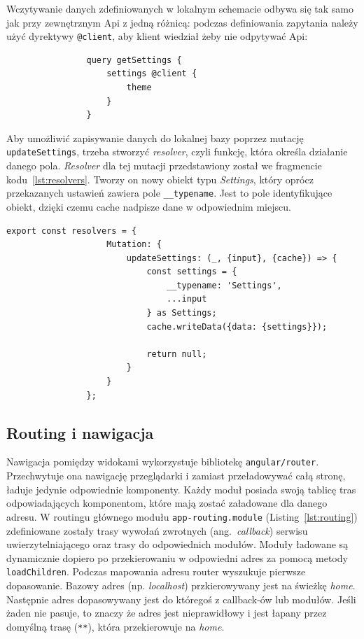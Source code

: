 			Wczytywanie danych zdefiniowanych w lokalnym schemacie odbywa się tak samo jak przy zewnętrznym Api z jedną różnicą:
			podczas definiowania zapytania należy użyć dyrektywy \verb|@client|, aby klient wiedział żeby nie odpytywać Api:
			\begin{lstlisting}
				query getSettings {
					settings @client {
						theme
					}
				}
			\end{lstlisting}

			Aby umożliwić zapisywanie danych do lokalnej bazy poprzez mutację \verb|updateSettings|,
			trzeba stworzyć \emph{resolver}, czyli funkcję, która określa działanie danego pola.
			\emph{Resolver} dla tej mutacji przedstawiony został we fragmencie kodu~\ref{lst:resolvers}.
			Tworzy on nowy obiekt typu \emph{Settings}, który oprócz przekazanych ustawień zawiera pole \verb|__typename|.
			Jest to pole identyfikujące obiekt, dzięki czemu cache nadpisze dane w odpowiednim miejscu.
			\begin{lstlisting}[label=lst:resolvers, caption=\emph{Resolvers} dla lokalnego cache, float=th]
				export const resolvers = {
					Mutation: {
						updateSettings: (_, {input}, {cache}) => {
							const settings = {
								__typename: 'Settings',
								...input
							} as Settings;
							cache.writeData({data: {settings}});

							return null;
						}
					}
				};
			\end{lstlisting}

	\subsection{Routing i nawigacja}
		Nawigacja pomiędzy widokami wykorzystuje bibliotekę \verb|angular/router|.
		Przechwytuje ona nawigację przeglądarki i zamiast przeładowywać całą stronę, ładuje jedynie odpowiednie komponenty.
		Każdy moduł posiada swoją tablicę tras odpowiadających komponentom, które mają zostać załadowane dla danego adresu.
		W routingu głównego modułu \verb|app-routing.module| (Listing~\ref{lst:routing})
		zdefiniowane zostały trasy wywołań zwrotnych (ang.\ \emph{callback}) serwisu uwierzytelniającego oraz trasy do odpowiednich modułów.
		Moduły ładowane są dynamicznie dopiero po przekierowaniu w odpowiedni adres za pomocą metody \verb|loadChildren|.
		Podczas mapowania adresu router wyszukuje pierwsze dopasowanie.
		Bazowy adres (np. \emph{localhost}) przkierowywany jest na świeżkę \emph{home}.
		Następnie adres dopasowywany jest do któregoś z callback-ów lub modułów.
		Jeśli żaden nie pasuje, to znaczy że adres jest nieprawidłowy i jest łapany przez domyślną trasę (\verb|**|), która przekierowuje na \emph{home}.

